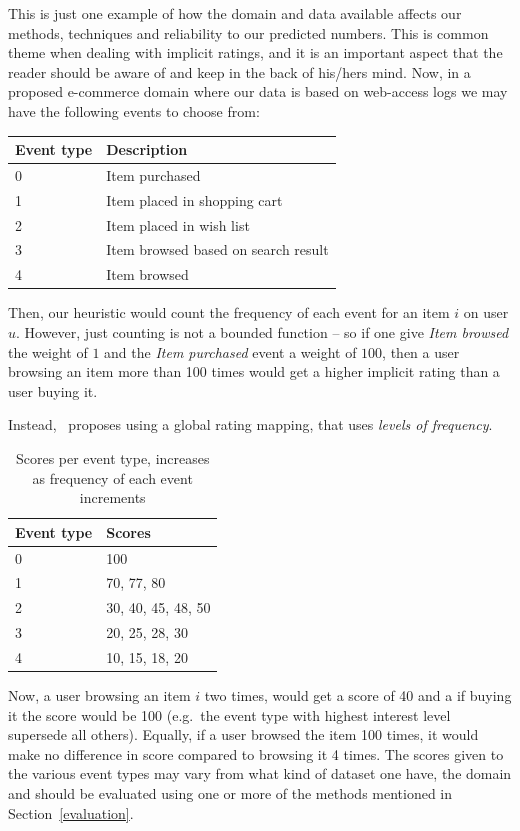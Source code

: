 This is just one example of how the domain and data available affects our
methods, techniques and reliability to our predicted numbers. This is common
theme when dealing with implicit ratings, and it is an important aspect that
the reader should be aware of and keep in the back of his/hers mind. Now, in a
proposed e-commerce domain where our data is based on web-access logs we may
have the following events to choose from:

\begin{table}[H]
  \centering
  \begin{tabular}{ll}
  \toprule
  Event type & Description \\ \midrule
  0 & Item purchased \\
  1 & Item placed in shopping cart \\
  2 & Item placed in wish list \\
  3 & Item browsed based on search result \\
  4 & Item browsed \\
  \bottomrule
  \end{tabular}
\end{table}

Then, our heuristic would count the frequency of each event for an item $i$ on
user $u$. However, just counting is not a bounded function – so if one give
\textit{Item browsed} the weight of $1$ and the \textit{Item purchased} event
a weight of $100$, then a user browsing an item more than 100 times would get a
higher implicit rating than a user buying it.

Instead,~\cite{pkghost2014implicit} proposes using a global rating mapping,
that uses \textit{levels of frequency}.

\begin{table}[H]
  \centering
  \begin{tabular}{ll}
  \toprule
  Event type & Scores \\ \midrule
  0 & 100 \\
  1 & 70, 77, 80 \\
  2 & 30, 40, 45, 48, 50 \\
  3 & 20, 25, 28, 30 \\
  4 & 10, 15, 18, 20 \\
  \bottomrule
  \end{tabular}
  \caption{Scores per event type, increases as frequency of each event
           increments}
\label{implicit-table}
\end{table}

Now, a user browsing an item $i$ two times, would get a score of 40 and a if
buying it the score would be 100 (e.g.\ the event type with highest interest
level supersede all others). Equally, if a user browsed the item 100 times, it
would make no difference in score compared to browsing it 4 times. The scores
given to the various event types may vary from what kind of dataset one have,
the domain and should be evaluated using one or more of the methods mentioned
in Section~\ref{evaluation}.

